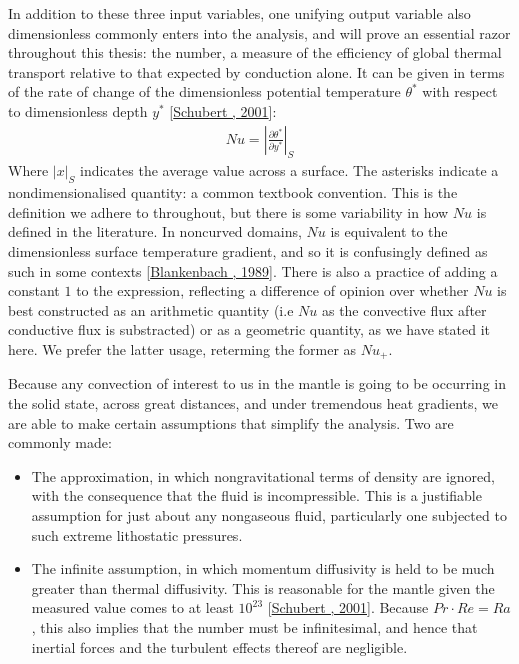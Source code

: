 \documentclass[letterpaper,10pt,english]{jupyterBook}
\begin{document}
\sphinxAtStartPar
In addition to these three input variables, one unifying output variable \sphinxhyphen{} also dimensionless \sphinxhyphen{} commonly enters into the analysis, and will prove an essential razor throughout this thesis: the  number, a measure of the efficiency of global thermal transport relative to that expected by conduction alone. It can be given in terms of the rate of change of the dimensionless potential temperature \(\theta^*\) with respect to dimensionless depth \(y^*\) {[}\hyperlink{cite.references:id663}{Schubert , 2001}{]}:
\begin{equation*}
\begin{split} Nu = \left| \frac{\partial \theta^*}{\partial y^*} \right| _S \end{split}
\end{equation*}
\sphinxAtStartPar
Where \(|x|_S\) indicates the average value across a surface. The asterisks indicate a non\sphinxhyphen{}dimensionalised quantity: a common textbook convention. This is the definition we adhere to throughout, but there is some variability in how \(Nu\) is defined in the literature. In non\sphinxhyphen{}curved domains, \(Nu\) is equivalent to the dimensionless surface temperature gradient, and so it is confusingly defined as such in some contexts {[}\hyperlink{cite.references:id372}{Blankenbach , 1989}{]}. There is also a practice of adding a constant \(1\) to the expression, reflecting a difference of opinion over whether \(Nu\) is best constructed as an arithmetic quantity (i.e \(Nu\) as the convective flux after conductive flux is substracted) or as a geometric quantity, as we have stated it here. We prefer the latter usage, reterming the former as \(Nu_{+}\).

\sphinxAtStartPar
Because any convection of interest to us in the mantle is going to be occurring in the solid state, across great distances, and under tremendous heat gradients, we are able to make certain assumptions that simplify the analysis. Two are commonly made:
\begin{itemize}
\item {} 
\sphinxAtStartPar
The  approximation, in which non\sphinxhyphen{}gravitational terms of density are ignored, with the consequence that the fluid is incompressible. This is a justifiable assumption for just about any non\sphinxhyphen{}gaseous fluid, particularly one subjected to such extreme lithostatic pressures.

\item {} 
\sphinxAtStartPar
The infinite  assumption, in which momentum diffusivity is held to be much greater than thermal diffusivity. This is reasonable for the mantle given the measured value comes to at least \(10^{23}\) {[}\hyperlink{cite.references:id663}{Schubert , 2001}{]}. Because \(Pr \cdot Re = Ra\), this also implies that the  number must be infinitesimal, and hence that inertial forces and the turbulent effects thereof are negligible.

\end{itemize}
\end{document}
